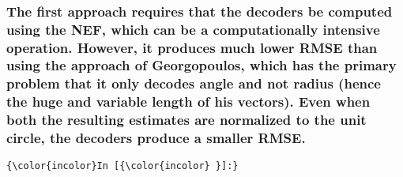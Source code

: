 \documentclass{article}
\begin{document}
    \begin{center}
    \end{center}
    { \hspace*{\fill} \\}
    
    \begin{center}
    \end{center}
    { \hspace*{\fill} \\}
    
    \begin{center}
    \end{center}
    { \hspace*{\fill} \\}
    
    \subsubsection{The first approach requires that the decoders be computed
using the NEF, which can be a computationally intensive operation.
However, it produces much lower RMSE than using the approach of
Georgopoulos, which has the primary problem that it only decodes angle
and not radius (hence the huge and variable length of his vectors). Even
when both the resulting estimates are normalized to the unit circle, the
decoders produce a smaller
RMSE.}\label{the-first-approach-requires-that-the-decoders-be-computed-using-the-nef-which-can-be-a-computationally-intensive-operation.-however-it-produces-much-lower-rmse-than-using-the-approach-of-georgopoulos-which-has-the-primary-problem-that-it-only-decodes-angle-and-not-radius-hence-the-huge-and-variable-length-of-his-vectors.-even-when-both-the-resulting-estimates-are-normalized-to-the-unit-circle-the-decoders-produce-a-smaller-rmse.}

    \begin{Verbatim}[commandchars=\\\{\}]
{\color{incolor}In [{\color{incolor} }]:} 
\end{Verbatim}


    
    
    
    
\end{document}
